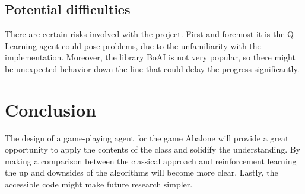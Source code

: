 \documentclass{llncs}
\begin{document}
\subsection{Potential difficulties}
There are certain risks involved with the project. First and foremost it is the Q-Learning agent could pose problems, due to the unfamiliarity with the implementation. Moreover, the library BoAI is not very popular, so there might be unexpected behavior down the line that could delay the progress significantly.

\section{Conclusion}
The design of a game-playing agent for the game Abalone will provide a great opportunity to apply the contents of the class and solidify the understanding. By making a comparison between the classical approach and reinforcement learning the up and downsides of the algorithms will become more clear. Lastly, the accessible code might make future research simpler.



\end{document}
